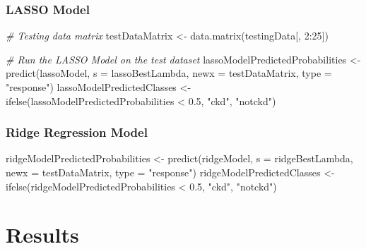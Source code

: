 \documentclass[
]{article}
\newenvironment{Shaded}{\begin{snugshade}}{\end{snugshade}}
\newcommand{\AttributeTok}[1]{\textcolor[rgb]{0.77,0.63,0.00}{#1}}
\newcommand{\CommentTok}[1]{\textcolor[rgb]{0.56,0.35,0.01}{\textit{#1}}}
\newcommand{\DecValTok}[1]{\textcolor[rgb]{0.00,0.00,0.81}{#1}}
\newcommand{\FloatTok}[1]{\textcolor[rgb]{0.00,0.00,0.81}{#1}}
\newcommand{\FunctionTok}[1]{\textcolor[rgb]{0.00,0.00,0.00}{#1}}
\newcommand{\NormalTok}[1]{#1}
\newcommand{\OtherTok}[1]{\textcolor[rgb]{0.56,0.35,0.01}{#1}}
\newcommand{\SpecialCharTok}[1]{\textcolor[rgb]{0.00,0.00,0.00}{#1}}
\newcommand{\StringTok}[1]{\textcolor[rgb]{0.31,0.60,0.02}{#1}}
\begin{document}
\hypertarget{lasso-model}{%
\subsubsection{LASSO Model}\label{lasso-model}}

\begin{Shaded}
\begin{Highlighting}[]
\CommentTok{\# Testing data matrix}
\NormalTok{testDataMatrix }\OtherTok{\textless{}{-}} \FunctionTok{data.matrix}\NormalTok{(testingData[, }\DecValTok{2}\SpecialCharTok{:}\DecValTok{25}\NormalTok{])}

\CommentTok{\# Run the LASSO Model on the test dataset}
\NormalTok{lassoModelPredictedProbabilities }\OtherTok{\textless{}{-}} \FunctionTok{predict}\NormalTok{(lassoModel, }\AttributeTok{s =}\NormalTok{ lassoBestLambda, }
    \AttributeTok{newx =}\NormalTok{ testDataMatrix, }\AttributeTok{type =} \StringTok{"response"}\NormalTok{)}
\NormalTok{lassoModelPredictedClasses }\OtherTok{\textless{}{-}} \FunctionTok{ifelse}\NormalTok{(lassoModelPredictedProbabilities }\SpecialCharTok{\textless{}} \FloatTok{0.5}\NormalTok{, }
    \StringTok{"ckd"}\NormalTok{, }\StringTok{"notckd"}\NormalTok{)}
\end{Highlighting}
\end{Shaded}

\hypertarget{ridge-regression-model}{%
\subsubsection{Ridge Regression Model}\label{ridge-regression-model}}

\begin{Shaded}
\begin{Highlighting}[]
\NormalTok{ridgeModelPredictedProbabilities }\OtherTok{\textless{}{-}} \FunctionTok{predict}\NormalTok{(ridgeModel, }\AttributeTok{s =}\NormalTok{ ridgeBestLambda, }
    \AttributeTok{newx =}\NormalTok{ testDataMatrix, }\AttributeTok{type =} \StringTok{"response"}\NormalTok{)}
\NormalTok{ridgeModelPredictedClasses }\OtherTok{\textless{}{-}} \FunctionTok{ifelse}\NormalTok{(ridgeModelPredictedProbabilities }\SpecialCharTok{\textless{}} \FloatTok{0.5}\NormalTok{, }
    \StringTok{"ckd"}\NormalTok{, }\StringTok{"notckd"}\NormalTok{)}
\end{Highlighting}
\end{Shaded}

\hypertarget{results}{%
\section{Results}\label{results}}
\end{document}
